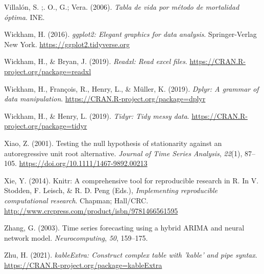 \documentclass[
]{article}
\newlength{\cslhangindent}
\newlength{\cslentryspacingunit} %
\newenvironment{CSLReferences}[2] %
 {%
  \setlength{\parindent}{0pt}
  \ifodd #1
  \let\oldpar\par
  \def\par{\hangindent=\cslhangindent\oldpar}
  \fi
  \setlength{\parskip}{#2\cslentryspacingunit}
 }%
 {}
\begin{document}
\begin{CSLReferences}{1}{0}
\leavevmode{}%
Villalón, S. ;. O., G.; Vera. (2006). \emph{Tabla de vida por método de
mortalidad óptima}. INE.

\leavevmode{}%
Wickham, H. (2016). \emph{ggplot2: Elegant graphics for data analysis}.
Springer-Verlag New York. \url{https://ggplot2.tidyverse.org}

\leavevmode{}%
Wickham, H., \& Bryan, J. (2019). \emph{Readxl: Read excel files}.
\url{https://CRAN.R-project.org/package=readxl}

\leavevmode{}%
Wickham, H., François, R., Henry, L., \& Müller, K. (2019). \emph{Dplyr:
A grammar of data manipulation}.
\url{https://CRAN.R-project.org/package=dplyr}

\leavevmode{}%
Wickham, H., \& Henry, L. (2019). \emph{Tidyr: Tidy messy data}.
\url{https://CRAN.R-project.org/package=tidyr}

\leavevmode{}%
Xiao, Z. (2001). Testing the null hypothesis of stationarity against an
autoregressive unit root alternative. \emph{Journal of Time Series
Analysis}, \emph{22}(1), 87--105.
\url{https://doi.org/10.1111/1467-9892.00213}

\leavevmode{}%
Xie, Y. (2014). Knitr: A comprehensive tool for reproducible research in
{R}. In V. Stodden, F. Leisch, \& R. D. Peng (Eds.), \emph{Implementing
reproducible computational research}. Chapman; Hall/CRC.
\url{http://www.crcpress.com/product/isbn/9781466561595}

\leavevmode{}%
Zhang, G. (2003). Time series forecasting using a hybrid ARIMA and
neural network model. \emph{Neurocomputing}, \emph{50}, 159--175.

\leavevmode{}%
Zhu, H. (2021). \emph{kableExtra: Construct complex table with 'kable'
and pipe syntax}. \url{https://CRAN.R-project.org/package=kableExtra}

\end{CSLReferences}
\end{document}
